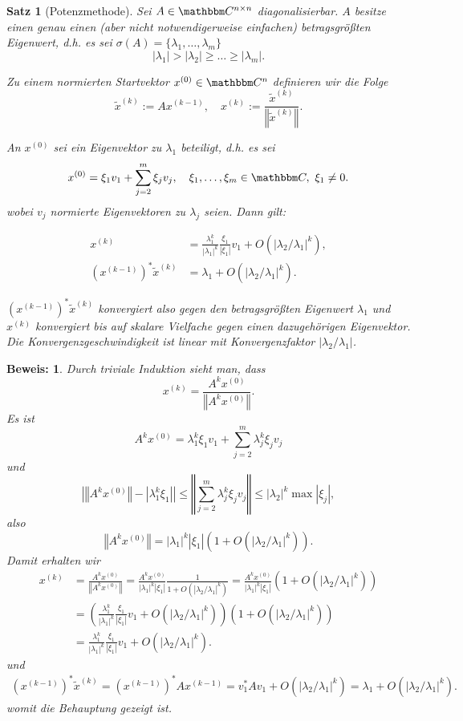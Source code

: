 \documentclass[12pt,a4paper]{book}
\theoremstyle{break}
\newtheorem{theorem}{Satz}[chapter]
\theoremstyle{nonumberplain}
\newtheorem{beweis}{Beweis:}
\newcommand{\C}{\mathbbm C}
\newcommand{\norm}[1]{\left\Vert#1\right\Vert}		%
\newcommand{\1}{\mathbbm{1}} 			      	%
\begin{document}
\begin{theorem}[Potenzmethode]\label{satz:Potenzmethode}
Sei $A\in \C^{n\times n}$ diagonalisierbar. $A$ besitze einen genau einen (aber nicht notwendigerweise einfachen) betragsgrößten Eigenwert, d.h. es sei
$\sigma(A)=\{\lambda_1,\ldots,\lambda_m\}$
\[
|\lambda_1|> |\lambda_2|\geq \ldots \geq |\lambda_m|.
\] 

Zu einem normierten Startvektor $x^{(0)}\in \C^n$ definieren wir die Folge 
\[
\tilde x^{(k)}:=Ax^{(k-1)}, \quad x^{(k)}:=\frac{\tilde x^{(k)}}{\norm{\tilde x^{(k)}}}.
\]

An $x^{(0)}$ sei ein Eigenvektor zu $\lambda_1$ beteiligt, d.h. 
es sei 
\[
x^{(0)}=\xi_1 v_1 + \sum_{j=2}^m \xi_j v_j, \quad \xi_1,\ldots,\xi_m\in \C,\ \xi_1\neq 0.
\]
wobei $v_j$ normierte Eigenvektoren zu $\lambda_j$ seien. Dann gilt:

\begin{align*}
x^{(k)}&= \frac{\lambda_1^k}{|\lambda_1|^k} \frac{\xi_1}{|\xi_1|} v_1 + O(\left| \lambda_2 / \lambda_1\right|^k),\\
(x^{(k-1)})^* \tilde x^{(k)} &= \lambda_1 + O(\left| \lambda_2 / \lambda_1\right|^{k}).
\end{align*}

$(x^{(k-1)})^* \tilde x^{(k)}$ konvergiert also gegen den betragsgrößten Eigenwert $\lambda_1$ und $x^{(k)}$ konvergiert bis auf skalare Vielfache gegen einen dazugehörigen Eigenvektor. Die Konvergenzgeschwindigkeit ist linear mit Konvergenzfaktor $|\lambda_2 / \lambda_1|$.
\end{theorem}
\begin{beweis}
Durch triviale Induktion sieht man, dass
\[
x^{(k)}=\frac{A^{k}x^{(0)}}{\norm{A^{k}x^{(0)}}}.
\]
Es ist 
\[
A^{k}x^{(0)}=\lambda_1^k \xi_1 v_1 + \sum_{j=2}^m \lambda_j^k \xi_j v_j
\]
und 
\[
\left| \norm{A^{k}x^{(0)}}- |\lambda_1^k \xi_1| \right| \leq \norm{\sum_{j=2}^m \lambda_j^k \xi_j v_j}
\leq |\lambda_2|^k \max |\xi_j|,
\]
also 
\[
\norm{A^{k}x^{(0)}}=|\lambda_1|^k |\xi_1| \left( 1 + O(\left| \lambda_2 / \lambda_1\right|^k ) \right).
\]
Damit erhalten wir
\begin{align*}
x^{(k)}&=\frac{A^{k}x^{(0)}}{\norm{A^{k}x^{(0)}}}=\frac{A^{k}x^{(0)}}{|\lambda_1|^k |\xi_1|} \frac{1}{1 + O(\left| \lambda_2 / \lambda_1\right|^k )}
=\frac{A^{k}x^{(0)}}{|\lambda_1|^k |\xi_1|} \left( 1 + O(\left| \lambda_2 / \lambda_1\right|^k )\right)\\
&= \left( \frac{\lambda_1^k}{|\lambda_1|^k} \frac{\xi_1}{|\xi_1|} v_1 + O(\left| \lambda_2 / \lambda_1\right|^k ) \right)
 \left( 1 + O(\left| \lambda_2 / \lambda_1\right|^k )\right)\\
&=\frac{\lambda_1^k}{|\lambda_1|^k} \frac{\xi_1}{|\xi_1|} v_1 + O(\left| \lambda_2 / \lambda_1\right|^k).
\end{align*}
und %
\begin{align*}
(x^{(k-1)})^* \tilde x^{(k)}= (x^{(k-1)})^* A x^{(k-1)} = v_1^* A v_1 + O(\left| \lambda_2 / \lambda_1\right|^{k})
= \lambda_1 + O(\left| \lambda_2 / \lambda_1\right|^{k}).
\end{align*}
womit die Behauptung gezeigt ist.
\end{beweis}
\end{document}
